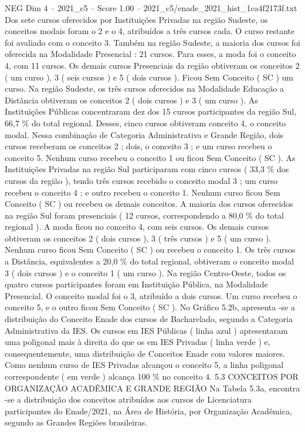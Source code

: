 \begin{textsample}{NEG Dim 4 – 2021\_c5 – Score 1.00 – 2021\_c5/enade\_2021\_hist\_1ca4f2173f.txt}
Dos sete cursos oferecidos por Instituições Privadas na região Sudeste, os conceitos modais foram o 2 e o 4, atribuídos a três cursos cada.
O curso restante foi avaliado com o conceito 3.
Também na região Sudeste, a maioria dos cursos foi oferecida na Modalidade Presencial : 21 cursos.
Para esses, a moda foi o conceito 4, com 11 cursos.
Os demais cursos Presenciais da região obtiveram os conceitos 2 ( um curso ), 3 ( seis cursos ) e 5 ( dois cursos ).
Ficou Sem Conceito ( SC ) um curso.
Na região Sudeste, os três cursos oferecidos na Modalidade Educação a Distância obtiveram os conceitos 2 ( dois cursos ) e 3 ( um curso ).
As Instituições Públicas concentraram dez dos 15 cursos participantes da região Sul, 66,7 \% do total regional.
Desses, cinco cursos obtiveram conceito 4, o conceito modal.
Nessa combinação de Categoria Administrativa e Grande Região, dois cursos receberam os conceitos 2 ; dois, o conceito 3 ; e um curso recebeu o conceito 5.
Nenhum curso recebeu o conceito 1 ou ficou Sem Conceito ( SC ).
As Instituições Privadas na região Sul participaram com cinco cursos ( 33,3 \% dos cursos da região ), tendo três cursos recebido o conceito modal 3 ; um curso recebeu o conceito 4 ; e outro recebeu o conceito 1.
Nenhum curso ficou Sem Conceito ( SC ) ou recebeu os demais conceitos.
A maioria dos cursos oferecidos na região Sul foram presenciais ( 12 cursos, correspondendo a 80,0 \% do total regional ).
A moda ficou no conceito 4, com seis cursos.
Os demais cursos obtiveram os conceitos 2 ( dois cursos ), 3 ( três cursos ) e 5 ( um curso ).
Nenhum curso ficou Sem Conceito ( SC ) ou recebeu o conceito 1.
Os três cursos a Distância, equivalentes a 20,0 \% do total regional, obtiveram o conceito modal 3 ( dois cursos ) e o conceito 1 ( um curso ).
Na região Centro-Oeste, todos os quatro cursos participantes foram em Instituição Pública, na Modalidade Presencial.
O conceito modal foi o 3, atribuído a dois cursos.
Um curso recebeu o conceito 5, e o outro ficou Sem Conceito ( SC ).
No Gráfico 5.2b, apresenta -se a distribuição do Conceito Enade dos cursos de Bacharelado, segundo a Categoria Administrativa da IES.
Os cursos em IES Públicas ( linha azul ) apresentaram uma poligonal mais à direita do que os em IES Privadas ( linha verde ) e, consequentemente, uma distribuição de Conceitos Enade com valores maiores.
Como nenhum curso de IES Privadas alcançou o conceito 5, a linha poligonal correspondente ( em verde ) alcança 100 \% no conceito 4. 5.3 CONCEITOS POR ORGANIZAÇÃO ACADÊMICA E GRANDE REGIÃO Na Tabela 5.3a, encontra -se a distribuição dos conceitos atribuídos aos cursos de Licenciatura participantes do Enade/2021, na Área de História, por Organização Acadêmica, segundo as Grandes Regiões brasileiras.

\end{textsample}
